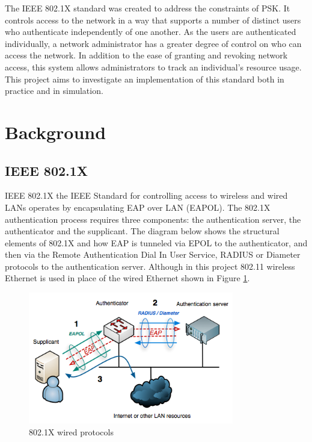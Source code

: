 \documentclass[pdftex, 12pt, a4paper]{article}
\begin{document}
The IEEE 802.1X standard was created to address the constraints of PSK. It controls access to the network in a way that supports a number of distinct users who authenticate independently of one another. As the users are authenticated individually, a network administrator has a greater degree of control on who can access the network. In addition to the ease of granting and revoking network access, this system allows administrators to track an individual's resource usage.  This project aims to investigate an implementation of this standard both in practice and in simulation.

\section{Background}
\subsection{IEEE 802.1X}
IEEE 802.1X the IEEE Standard for controlling access to wireless and wired LANs operates by encapsulating EAP over LAN (EAPOL)\cite{IEEE8021X-2004}.  The 802.1X authentication process requires three components: the authentication server, the authenticator and the supplicant.  The diagram below shows the structural elements of 802.1X and how EAP is tunneled via EPOL to the authenticator, and then via the Remote Authentication Dial In User Service, RADIUS or Diameter protocols to the authentication server. Although in this project 802.11 wireless Ethernet is used in place of the wired Ethernet shown in Figure \ref{fig:img-1}.

\begin{figure}[htb]
\centering
\includegraphics[width=0.8\textwidth]{img/8021X.png}
\caption{802.1X wired protocols \protect\cite{8021X-diag}}
\label{fig:img-1}
\end{figure}
\end{document}
